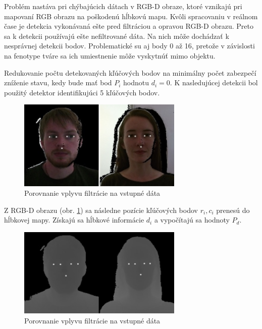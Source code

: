 Problém nastáva pri chýbajúcich dátach v RGB-D obraze, ktoré vznikajú pri mapovaní RGB obrazu na poškodenú hĺbkovú mapu. Kvôli spracovaniu v reálnom čase je detekcia vykonávaná ešte pred filtráciou a opravou RGB-D obrazu. Preto sa k detekcii používajú ešte nefiltrované dáta. Na nich môže dochádzať k nesprávnej detekcii bodov. Problematické su aj body 0 až 16, pretože v závislosti na fenotype tváre sa ich umiestnenie môže vyskytnúť mimo objektu. 

Redukovanie počtu detekovaných kľúčových bodov na minimálny počet zabezpečí zníženie stavu, kedy bude mať bod $P_i$ hodnotu $d_i=0$. K nasledujúcej detekcii bol použitý detektor identifikujúci 5 kľúčových bodov. 
 
\begin{figure}[H]
	\centering
	\includegraphics[width=0.70\textwidth]{figures/rgbd_points.png}
	\caption{Porovnanie vplyvu filtrácie na vstupné dáta}
	\label{fig:dlib:rbbd5}
\end{figure}

\noindent Z RGB-D obrazu (obr. \ref{fig:dlib:rbbd5}) sa následne pozície kľúčových bodov $r_i, c_i$ prenesú do hĺbkovej mapy. Získajú sa hĺbkové informácie $d_i$ a vypočítajú sa hodnoty $P_d$. 

\begin{figure}[H]
	\centering
	\includegraphics[width=0.70\textwidth]{figures/depth_points.png}
	\caption{Porovnanie vplyvu filtrácie na vstupné dáta}
	\label{fig:dlib:depth5}
\end{figure}

